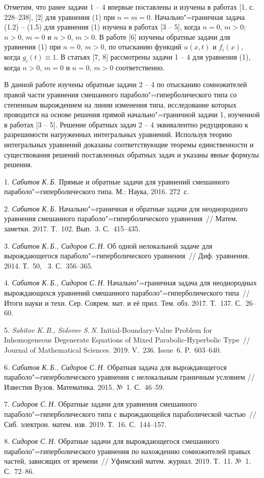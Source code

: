 Отметим, что ранее задачи 1 -- 4 впервые поставлены и изучены в работах [1, с. 228--238], [2] для уравнения (1) при $n=m=0$. Начально"=граничная задача (1.2) -- (1.5) для уравнения (1) изучена в работах [3 -- 5], когда $n=0$, $m>0$; $n>0$, $m=0$ и $n>0$, $m>0$.
В работе [6] изучены обратные задачи для уравнения (1) при $n=0$, $m>0$, по отысканию функций $u(x,t)$ и $f_i(x)$, когда $g_i(t)\equiv1$. В статьях [7, 8] рассмотрены задачи 1 -- 4 для уравнения (1), когда $n>0$, $m=0$ и $n=0$, $m>0$ соответственно.


В данной работе изучены обратные задачи 2 -- 4 по отысканию сомножителей правой части уравнения смешанного параболо"=гиперболического типа со степенным вырождением на линии изменения типа, исследование которых проводится на основе решения прямой начально"=граничной задачи 1, изученной в работах [3 -- 5]. Решение обратных задач 2 -- 4 эквивалентно редуцировано к разрешимости нагруженных интегральных уравнений. Используя теорию интегральных уравнений доказаны соответствующие теоремы единственности и существования решений поставленных обратных задач и указаны явные формулы решения.


\litlist

1. {\it Сабитов К.\,Б.} {Прямые и обратные задачи для уравнений смешанного параболо"=гиперболического типа. М.: Наука, 2016. 272~с.}

2. {\it Сабитов К.\,Б.} {Начально"=граничная и обратные задачи для неоднородного уравнения смешанного параболо"=гиперболического уравнения~// Матем. заметки. 2017. Т.~102. Вып.~3. С.~415--435.}

3. {\it Сабитов К.\,Б., Сидоров С.\,Н.} {Об одной нелокальной задаче для вырождающегося па\-ра\-бо\-ло"=гиперболического уравнения~// Диф. уравнения. 2014. Т.~50, \No~3. С.~356--365.}

4. {\it Сабитов К.\,Б., Сидоров С.\,Н.} {Начально"=граничная задача для неоднородных вырождающихся уравнений смешанного параболо"=гиперболического типа~// Итоги науки и техн. Сер. Соврем. мат. и её прил. Тем. обз. 2017. Т.~137. С.~26--60.}

5. {\it Sabitov K.\,B., Sidorov S.\,N.} {Initial-Boundary-Value Problem for Inhomogeneous Degenerate Equations of Mixed Parabolic-Hyperbolic Type~// Journal of Mathematical Sciences. 2019. V.~236. Issue~6. P.~603--640.}

6. {\it Сабитов К.\,Б., Сидоров С.\,Н.} {Обратная задача для вырождающегося параболо"=гиперболического уравнения с нелокальным граничным условием // Известия Вузов. Математика. 2015. №~1. С.~46--59.}

7. {\it Сидоров С.\,Н.} {Обратные задачи для уравнения смешанного параболо"=гиперболического типа с вырождающейся параболической частью~// Сиб. электрон. матем. изв. 2019. Т.~16. С.~144--157.}

8. {\it Сидоров С.\,Н.} {Обратные задачи для вырождающегося смешанного параболо"=гиперболического уравнения по нахождению сомножителей правых частей, зависящих от времени~// Уфимский матем. журнал. 2019. Т.~11. №~1. С.~72--86.}
